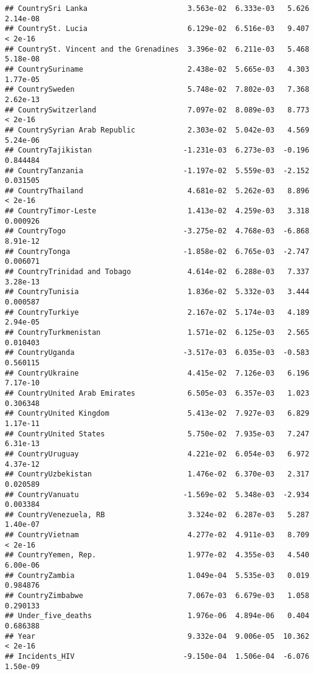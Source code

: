 \documentclass[
]{article}
\begin{document}
\begin{verbatim}
## CountrySri Lanka                       3.563e-02  6.333e-03   5.626 2.14e-08
## CountrySt. Lucia                       6.129e-02  6.516e-03   9.407  < 2e-16
## CountrySt. Vincent and the Grenadines  3.396e-02  6.211e-03   5.468 5.18e-08
## CountrySuriname                        2.438e-02  5.665e-03   4.303 1.77e-05
## CountrySweden                          5.748e-02  7.802e-03   7.368 2.62e-13
## CountrySwitzerland                     7.097e-02  8.089e-03   8.773  < 2e-16
## CountrySyrian Arab Republic            2.303e-02  5.042e-03   4.569 5.24e-06
## CountryTajikistan                     -1.231e-03  6.273e-03  -0.196 0.844484
## CountryTanzania                       -1.197e-02  5.559e-03  -2.152 0.031505
## CountryThailand                        4.681e-02  5.262e-03   8.896  < 2e-16
## CountryTimor-Leste                     1.413e-02  4.259e-03   3.318 0.000926
## CountryTogo                           -3.275e-02  4.768e-03  -6.868 8.91e-12
## CountryTonga                          -1.858e-02  6.765e-03  -2.747 0.006071
## CountryTrinidad and Tobago             4.614e-02  6.288e-03   7.337 3.28e-13
## CountryTunisia                         1.836e-02  5.332e-03   3.444 0.000587
## CountryTurkiye                         2.167e-02  5.174e-03   4.189 2.94e-05
## CountryTurkmenistan                    1.571e-02  6.125e-03   2.565 0.010403
## CountryUganda                         -3.517e-03  6.035e-03  -0.583 0.560115
## CountryUkraine                         4.415e-02  7.126e-03   6.196 7.17e-10
## CountryUnited Arab Emirates            6.505e-03  6.357e-03   1.023 0.306348
## CountryUnited Kingdom                  5.413e-02  7.927e-03   6.829 1.17e-11
## CountryUnited States                   5.750e-02  7.935e-03   7.247 6.31e-13
## CountryUruguay                         4.221e-02  6.054e-03   6.972 4.37e-12
## CountryUzbekistan                      1.476e-02  6.370e-03   2.317 0.020589
## CountryVanuatu                        -1.569e-02  5.348e-03  -2.934 0.003384
## CountryVenezuela, RB                   3.324e-02  6.287e-03   5.287 1.40e-07
## CountryVietnam                         4.277e-02  4.911e-03   8.709  < 2e-16
## CountryYemen, Rep.                     1.977e-02  4.355e-03   4.540 6.00e-06
## CountryZambia                          1.049e-04  5.535e-03   0.019 0.984876
## CountryZimbabwe                        7.067e-03  6.679e-03   1.058 0.290133
## Under_five_deaths                      1.976e-06  4.894e-06   0.404 0.686388
## Year                                   9.332e-04  9.006e-05  10.362  < 2e-16
## Incidents_HIV                         -9.150e-04  1.506e-04  -6.076 1.50e-09

\end{verbatim}
\end{document}
